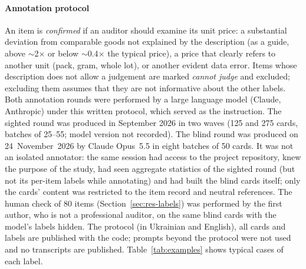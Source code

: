 \documentclass[conference]{IEEEtran}
\begin{document}
\paragraph{Annotation protocol} An item is \emph{confirmed} if an auditor should examine its unit price:
a substantial deviation from comparable goods not explained by the description (as a guide, above
$\sim$2$\times$ or below $\sim$0.4$\times$ the typical price), a price that clearly refers to another unit
(pack, gram, whole lot), or another evident data error. Items whose description does not allow a judgement
are marked \emph{cannot judge} and excluded; excluding them assumes that they are not informative about
the other labels. Both annotation rounds were performed by a large language model (Claude, Anthropic)
under this written protocol, which served as the instruction. The sighted round was produced in
September 2026 in two waves (125 and 275 cards, batches of 25--55; model version not recorded). The blind
round was produced on 24~November~2026 by Claude Opus~5.5 in eight batches of 50 cards. It was not an
isolated annotator: the same session had access to the project repository, knew the purpose of the study,
had seen aggregate statistics of the sighted round (but not its per-item labels while annotating) and had
built the blind cards itself; only the cards' content was restricted to the item record and neutral
references. The human check of 80 items (Section~\ref{sec:res-labels}) was performed by the first author,
who is not a professional auditor, on the same blind cards with the model's labels hidden. The protocol (in
Ukrainian and English), all cards and labels are published with the code; prompts beyond the protocol were
not used and no transcripts are published. Table~\ref{tab:examples} shows typical cases of each label.
\end{document}

